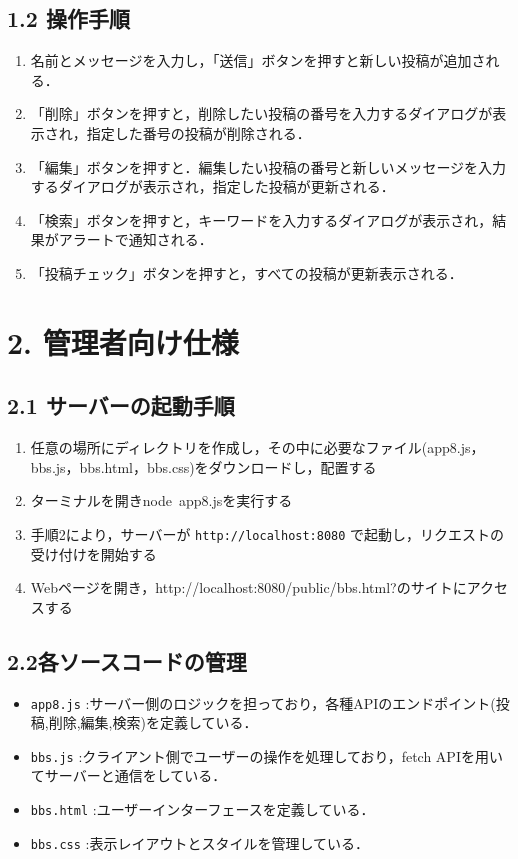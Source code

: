 \documentclass[uplatex,dvipdfmx]{jsarticle}
\begin{document}
\subsection*{1.2 操作手順}
\begin{enumerate}
\item 名前とメッセージを入力し，「送信」ボタンを押すと新しい投稿が追加される．
\item 「削除」ボタンを押すと，削除したい投稿の番号を入力するダイアログが表示され，指定した番号の投稿が削除される．
\item 「編集」ボタンを押すと．編集したい投稿の番号と新しいメッセージを入力するダイアログが表示され，指定した投稿が更新される．
\item 「検索」ボタンを押すと，キーワードを入力するダイアログが表示され，結果がアラートで通知される．
\item 「投稿チェック」ボタンを押すと，すべての投稿が更新表示される．
\end{enumerate}

\section*{2. 管理者向け仕様}
\subsection*{2.1 サーバーの起動手順}
\begin{enumerate}
\item 任意の場所にディレクトリを作成し，その中に必要なファイル(app8.js，bbs.js，bbs.html，bbs.css)をダウンロードし，配置する
\item ターミナルを開きnode\ app8.jsを実行する
\item 手順2により，サーバーが \texttt{http://localhost:8080} で起動し，リクエストの受け付けを開始する
\item Webページを開き，http://localhost:8080/public/bbs.html?のサイトにアクセスする
\end{enumerate}
\subsection*{2.2各ソースコードの管理}
\begin{itemize}
\item \texttt{app8.js} :サーバー側のロジックを担っており，各種APIのエンドポイント(投稿,削除,編集,検索)を定義している．
\item \texttt{bbs.js} :クライアント側でユーザーの操作を処理しており，fetch APIを用いてサーバーと通信をしている．
\item \texttt{bbs.html} :ユーザーインターフェースを定義している．
\item \texttt{bbs.css} :表示レイアウトとスタイルを管理している．
\end{itemize}
\end{document}
